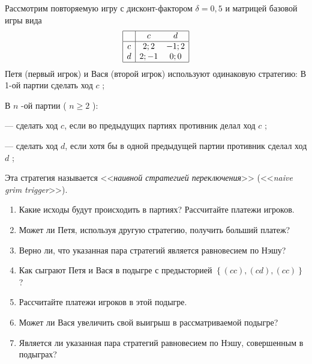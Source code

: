 \begin{problem}

Рассмотрим повторяемую игру с дисконт-фактором  $\delta =0,5$  и матрицей базовой игры вида
\[\begin{array}{|c|cc|}  \hline {} & {c} & {d} \\  \hline {c} & {2;2} & {-1;2} \\ {d} & {2;-1} & {0;0} \\  \hline  \end{array}\]
Петя (первый игрок) и Вася (второй игрок) используют одинаковую стратегию:
В 1-ой партии сделать ход  $c$ ;\par
В  $n$ -ой партии ( $n\ge 2$ ):\par
       --- сделать ход  $c$, если во  предыдущих партиях противник делал ход  $c$ ;\par
       --- сделать ход  $d$, если хотя бы в одной предыдущей партии противник сделал ход  $d$ ;\par
Эта стратегия называется <<{\it наивной стратегией переключения}>> (<<{\it naive grim trigger}>>).\par
\begin{enumerate}
\item Какие исходы будут происходить в партиях? Рассчитайте платежи игроков.\par
\item Может ли Петя, используя другую стратегию, получить больший платеж?\par
\item  Верно ли, что указанная пара стратегий является равновесием по Нэшу?\par
\item Как сыграют Петя и Вася в подыгре с предысторией  $\left\{\left(cc\right),\left(cd\right),\left(cc\right)\right\}$ ?\par
\item Рассчитайте платежи игроков в этой подыгре.\par
\item Может ли Вася увеличить свой выигрыш в рассматриваемой подыгре?\par
\item Является ли указанная пара стратегий равновесием по Нэшу, совершенным в подыграх?
\end{enumerate}


\begin{sol}

\end{sol}
\end{problem}



